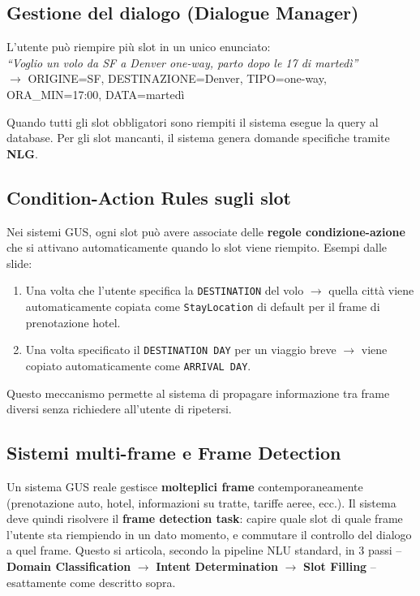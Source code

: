 \documentclass[12pt,a4paper]{article}
\begin{document}
\subsection{Gestione del dialogo (Dialogue Manager)}

L'utente può riempire più slot in un unico enunciato:\\
\textit{``Voglio un volo da SF a Denver one-way, parto dopo le 17 di martedì''}\\
$\to$ ORIGINE=SF, DESTINAZIONE=Denver, TIPO=one-way, ORA\_MIN=17:00, DATA=martedì

Quando tutti gli slot obbligatori sono riempiti il sistema esegue la query al database. Per gli slot mancanti, il sistema genera domande specifiche tramite \textbf{NLG}.

\subsection{Condition-Action Rules sugli slot}

Nei sistemi GUS, ogni slot può avere associate delle \textbf{regole condizione-azione} che si attivano automaticamente quando lo slot viene riempito. Esempi dalle slide:
\begin{enumerate}[leftmargin=1.5em, label=\arabic*.]
  \item Una volta che l'utente specifica la \texttt{DESTINATION} del volo $\to$ quella città viene automaticamente copiata come \texttt{StayLocation} di default per il frame di prenotazione hotel.
  \item Una volta specificato il \texttt{DESTINATION DAY} per un viaggio breve $\to$ viene copiato automaticamente come \texttt{ARRIVAL DAY}.
\end{enumerate}
Questo meccanismo permette al sistema di propagare informazione tra frame diversi senza richiedere all'utente di ripetersi.

\subsection{Sistemi multi-frame e Frame Detection}

Un sistema GUS reale gestisce \textbf{molteplici frame} contemporaneamente (prenotazione auto, hotel, informazioni su tratte, tariffe aeree, ecc.). Il sistema deve quindi risolvere il \textbf{frame detection task}: capire quale slot di quale frame l'utente sta riempiendo in un dato momento, e commutare il controllo del dialogo a quel frame. Questo si articola, secondo la pipeline NLU standard, in 3 passi -- \textbf{Domain Classification} $\to$ \textbf{Intent Determination} $\to$ \textbf{Slot Filling} -- esattamente come descritto sopra.
\end{document}
